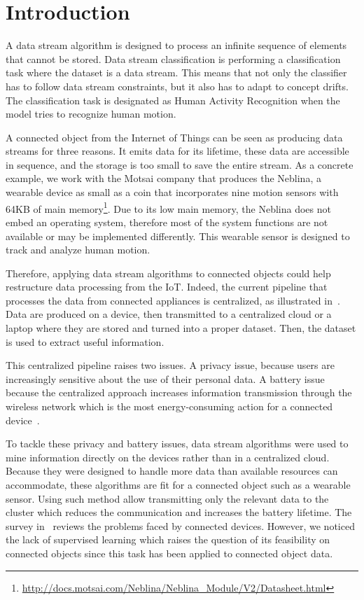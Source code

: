 \section{Introduction}
\label{sec:introduction}
A data stream algorithm is designed to process an
infinite sequence of elements that cannot be
stored. Data stream classification is performing a
classification task where the dataset is a data
stream. This means that not only the classifier
has to follow data stream constraints, but it also
has to adapt to concept drifts.  The
classification task is designated as Human
Activity Recognition when the model tries to
recognize human motion.

A connected object from the Internet of Things can
be seen as producing data streams for three
reasons. It emits data for its lifetime, these
data are accessible in sequence, and the storage
is too small to save the entire stream.  As a
concrete example, we work with the Motsai company
that produces the Neblina, a wearable device as
small as a coin that incorporates nine motion
sensors with 64KB of main
memory\footnote{\url{http://docs.motsai.com/Neblina/Neblina_Module/V2/Datasheet.html}}.
Due to its low main memory, the Neblina does not
embed an operating system, therefore most of the
system functions are not available or may be
implemented differently.  This wearable sensor is
designed to track and analyze human motion.

Therefore, applying data stream algorithms to
connected objects could help restructure data
processing from the IoT.  Indeed, the current
pipeline that processes the data from connected
appliances is centralized, as illustrated
in~\cite{recofit}.  Data are produced on a device,
then transmitted to a centralized cloud or a
laptop where they are stored and turned into a
proper dataset. Then, the dataset is used to
extract useful information. 

This centralized pipeline raises two issues. A
privacy issue, because users are increasingly
sensitive about the use of their personal data.  A
battery issue because the centralized approach
increases information transmission through the
wireless network which is the most
energy-consuming action for a connected
device~\cite{sensor-network-survey,
sensor-energy-model}.

To tackle these privacy and battery issues, data stream algorithms were used to
mine information directly on the devices rather than in a centralized cloud.
Because they were designed to handle more data than available resources can
accommodate, these algorithms are fit for a connected object such as a wearable
sensor.  Using such method allow transmitting only the relevant data to the
cluster which reduces the communication and increases the battery lifetime. The
survey in~\cite{kejariwal2015} reviews the problems faced by connected devices.
However, we noticed the lack of supervised learning which raises the question
of its feasibility on connected objects since this task has been applied to
connected object data.

